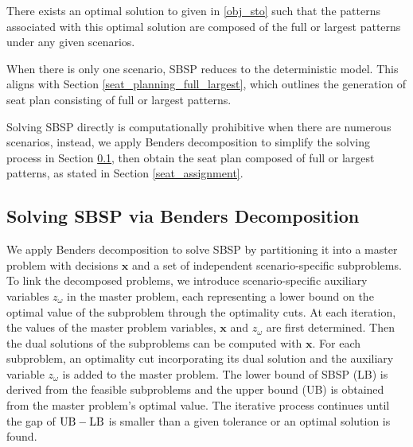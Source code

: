 \begin{prop}\label{prop_solution}
There exists an optimal solution to  given in \eqref{obj_sto} such that the patterns associated with this optimal solution are composed of the full or largest patterns under any given scenarios.
\end{prop}

When there is only one scenario, SBSP reduces to the deterministic model. This aligns with Section \ref{seat_planning_full_largest}, which outlines the generation of seat plan consisting of full or largest patterns.


Solving SBSP directly is computationally prohibitive when there are numerous scenarios, instead, we apply Benders decomposition to simplify the solving process in Section \ref{solve_by_benders}, then obtain the seat plan composed of full or largest patterns, as stated in Section \ref{seat_assignment}.

\subsection{Solving SBSP via Benders Decomposition}\label{solve_by_benders}
We apply Benders decomposition \citep{bnnobrs1962partitioning} to solve SBSP by partitioning it into a master problem with decisions $\mathbf{x}$ and a set of independent scenario-specific subproblems. To link the decomposed problems, we introduce scenario-specific auxiliary variables $z_{\omega}$ in the master problem, each representing a lower bound on the optimal value of the subproblem through the optimality cuts. At each iteration, the values of the master problem variables, $\mathbf{x}$ and $z_{\omega}$ are first determined. Then the dual solutions of the subproblems can be computed with $\mathbf{x}$. For each subproblem, an optimality cut incorporating its dual solution and the auxiliary variable $z_{\omega}$ is added to the master problem. The lower bound of SBSP (LB) is derived from the feasible subproblems and the upper bound (UB) is obtained from the master problem's optimal value. The iterative process continues until the gap of $\textup{UB} - \textup{LB}$ is smaller than a given tolerance or an optimal solution is found.




